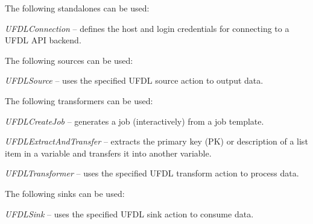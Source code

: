 \documentclass[a4paper]{book}
\begin{document}
\noindent The following standalones can be used:
\begin{tight_itemize}
  \item \textit{UFDLConnection} -- defines the host and login credentials for
  connecting to a UFDL API backend.
\end{tight_itemize}
The following sources can be used:
\begin{tight_itemize}
  \item \textit{UFDLSource} -- uses the specified UFDL source action to output data.
\end{tight_itemize}
The following transformers can be used:
\begin{tight_itemize}
  \item \textit{UFDLCreateJob} -- generates a job (interactively) from a job template.
  \item \textit{UFDLExtractAndTransfer} -- extracts the primary key (PK) or description of a list item
  in a variable and transfers it into another variable.
  \item \textit{UFDLTransformer} -- uses the specified UFDL transform action to process data.
\end{tight_itemize}
The following sinks can be used:
\begin{tight_itemize}
  \item \textit{UFDLSink} -- uses the specified UFDL sink action to consume data.
\end{tight_itemize}
\end{document}
